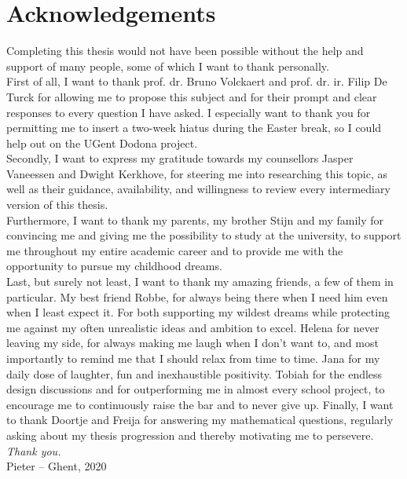 
\chapter*{Acknowledgements}

Completing this thesis would not have been possible without the help and support of many people, some of which I want to thank personally.\\

\noindent First of all, I want to thank prof. dr. Bruno Volckaert and prof. dr. ir. Filip De Turck for allowing me to propose this subject and for their prompt and clear responses to every question I have asked. I especially want to thank you for permitting me to insert a two-week hiatus during the Easter break, so I could help out on the UGent Dodona project.\\

\noindent Secondly, I want to express my gratitude towards my counsellors Jasper Vaneessen and Dwight Kerkhove, for steering me into researching this topic, as well as their guidance, availability, and willingness to review every intermediary version of this thesis.\\

\noindent Furthermore, I want to thank my parents, my brother Stijn and my family for convincing me and giving me the possibility to study at the university, to support me throughout my entire academic career and to provide me with the opportunity to pursue my childhood dreams.\\

\noindent Last, but surely not least, I want to thank my amazing friends, a few of them in particular. My best friend Robbe, for always being there when I need him even when I least expect it. For both supporting my wildest dreams while protecting me against my often unrealistic ideas and ambition to excel. Helena for never leaving my side, for always making me laugh when I don't want to, and most importantly to remind me that I should relax from time to time. Jana for my daily dose of laughter, fun and inexhaustible positivity. Tobiah for the endless design discussions and for outperforming me in almost every school project, to encourage me to continuously raise the bar and to never give up. Finally, I want to thank Doortje and Freija for answering my mathematical questions, regularly asking about my thesis progression and thereby motivating me to persevere.\\

\noindent \emph{Thank you.}\\

\noindent Pieter -- Ghent, 2020